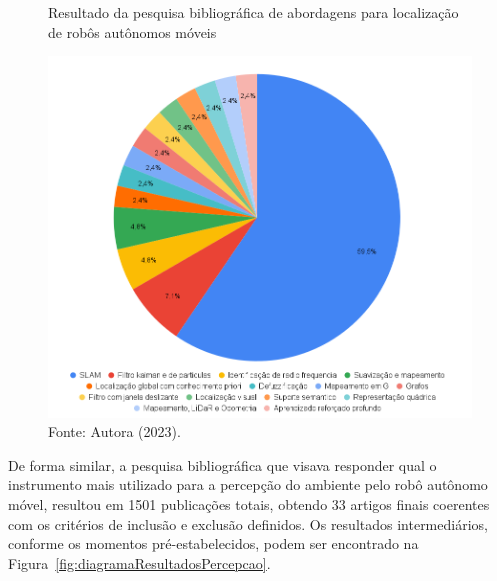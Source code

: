 \begin{figure}[h]
    \centering
    \caption{Resultado da pesquisa bibliográfica de abordagens para localização de robôs autônomos móveis}
    \includegraphics[scale=0.37]{resultadosAlgLocalizacao.png}
    \caption*{Fonte: Autora (2023).}
    \label{fig:graficoPesquisaLocalizacao}
\end{figure}

De forma similar, a pesquisa bibliográfica que visava responder qual o instrumento mais utilizado para a percepção do ambiente pelo robô autônomo móvel, resultou em 1501 publicações totais, obtendo 33 artigos finais coerentes com os critérios de inclusão e exclusão definidos. Os resultados intermediários, conforme os momentos pré-estabelecidos, podem ser encontrado na Figura~\ref{fig:diagramaResultadosPercepcao}. 

